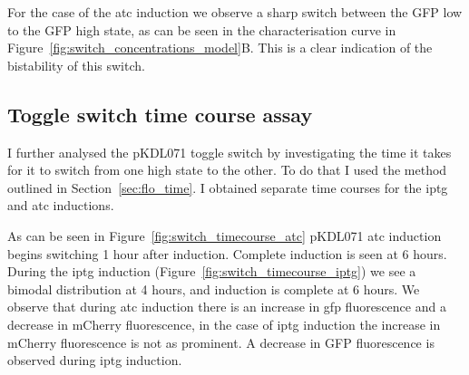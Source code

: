 For the case of the \acrshort{atc} induction we observe a sharp switch between the GFP low to the GFP high state, as can be seen in the characterisation curve in Figure~\ref{fig:switch_concentrations_model}B. This is a clear indication of the bistability of this switch.

\clearpage





\subsection{Toggle switch time course assay}
\label{sec:ts_time}
I further analysed the pKDL071 toggle switch by investigating the time it takes for it to switch from one high state to the other. To do that I used the method outlined in Section~\ref{sec:flo_time}. I obtained separate time courses for the \acrshort{iptg} and \acrshort{atc} inductions. 

As can be seen in Figure~\ref{fig:switch_timecourse_atc} pKDL071 \acrshort{atc}  induction begins switching 1 hour after induction. Complete induction is seen at 6 hours. During the \acrshort{iptg} induction (Figure~\ref{fig:switch_timecourse_iptg}) we see a bimodal distribution at 4 hours, and induction is complete at 6 hours. We observe that during \acrshort{atc} induction there is an increase in \acrshort{gfp} fluorescence and a decrease in mCherry fluorescence, in the case of \acrshort{iptg} induction the increase in mCherry fluorescence is not as prominent. A decrease in GFP fluorescence is observed during \acrshort{iptg} induction. 

